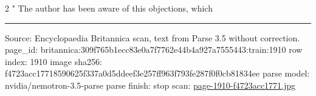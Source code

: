 \documentclass[10pt]{article}
\begin{document}
\begin{multicols}{2}
" The author has been aware of this objections, which

\end{multicols}
\vfill\par\noindent\rule{\linewidth}{0.4pt}\par
{\scriptsize\color{gray}\noindent Source: Encyclopaedia Britannica scan, text from Parse 3.5 without correction. page\_id: britannica:309f765b1ecc83e0a7f7762e44b4a927a7555443:train:1910 \quad row index: 1910 \quad image sha256: f4723acc17718590625f337a0d5ddeef3e257ff963f793fe287f0f0cb81834ee \quad parse model: nvidia/nemotron-3.5-parse \quad parse finish: stop \quad scan: \href{../scans/page-1910-f4723acc1771.jpg}{page-1910-f4723acc1771.jpg}\par}
\end{document}
